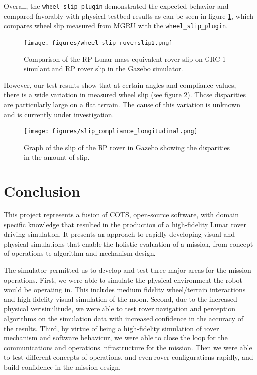 \documentclass[twocolumn,letterpaper]{IEEEAerospaceCLS}  %
\begin{document}
Overall, the \texttt{wheel\_slip\_plugin} demonstrated the expected behavior and compared favorably with physical testbed results as can be seen in figure \ref{fig:wheelsliptuningchart}, which compares wheel slip measured from MGRU with the \texttt{wheel\_slip\_plugin}.  

\begin{figure}[h!]
	\texttt{[image: figures/wheel\_slip\_roverslip2.png]}
   	\caption{Comparison of the RP Lunar mass equivalent rover slip on GRC-1 simulant and RP rover slip in the Gazebo simulator.}
    \label{fig:wheelsliptuningchart}
\end{figure}

However, our test results show that at certain angles and compliance values, there is a wide variation in measured wheel slip (see figure \ref{fig:slipdisparities}).  
Those disparities are particularly large on a flat terrain.  
The cause of this variation is unknown and is currently under investigation.  
\begin{figure}[h!]
	\texttt{[image: figures/slip\_compliance\_longitudinal.png]}
   	\caption{Graph of the slip of the RP rover in Gazebo showing the disparities in the amount of slip.}
    \label{fig:slipdisparities}
\end{figure}

\section{Conclusion}

This project represents a fusion of COTS, open-source software, with domain specific knowledge that resulted in the production of a high-fidelity Lunar rover driving simulation.  
It presents an approach to rapidly developing visual and physical simulations that enable the holistic evaluation of a mission, from concept of operations to algorithm and mechanism design.

The simulator permitted us to develop and test three major areas for the mission operations.  
First, we were able to simulate the physical environment the robot would be operating in.  
This includes medium fidelity wheel/terrain interactions and high fidelity visual simulation of the moon.  
Second, due to the increased physical verisimilitude, we were able to test rover navigation and perception algorithms on the simulation data with increased confidence in the accuracy of the results.  
Third, by virtue of being a high-fidelity simulation of rover mechanism and software behaviour, we were able to close the loop for the communications and operations infrastructure for the mission.  
 Then we were able to test different concepts of operations, and even rover configurations rapidly, and build confidence in the mission design.
\end{document}
